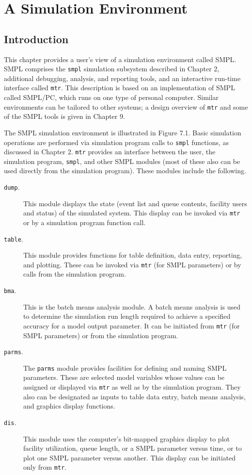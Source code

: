 \chapter{A Simulation Environment}
\label{chap:simulation-environment}

\section{Introduction}
\label{sec:simenv-intro}

This chapter provides a user's view of a simulation environment called
SMPL. SMPL comprises the \texttt{smpl} simulation subsystem described in Chapter
2, additional debugging, analysis, and reporting tools, and an interactive
run-time interface called \texttt{mtr}. This description is based on an implementation
of SMPL called SMPL/PC, which runs on one type of personal computer.
Similar environments can be tailored to other systems; a design overview of
\texttt{mtr} and some of the SMPL tools is given in Chapter 9.

The SMPL simulation environment is illustrated in Figure 7.1. Basic
simulation operations are performed via simulation program calls to \texttt{smpl}
functions, as discussed in Chapter 2. \texttt{mtr} provides an interface between the
user, the simulation program, \texttt{smpl}, and other SMPL modules (most of these
also can be used directly from the simulation program). These modules
include the following.

\begin{description}
\item[\texttt{dump}.] This module displays the state (event list and queue
contents, facility users and status) of the simulated system.
This display can be invoked via \texttt{mtr} or by a simulation
program function call.
\item[\texttt{table}.] This module provides functions for table definition,
data entry, reporting, and plotting. These can be invoked via
\texttt{mtr} (for SMPL parameters) or by calls from the simulation
program.
\item[\texttt{bma}.] This is the batch means analysis module. A batch
means analysis is used to determine the simulation run
length required to achieve a specified accuracy for a model
output parameter. It can be initiated from \texttt{mtr} (for SMPL
parameters) or from the simulation program.
\item[\texttt{parms}.] The \texttt{parms} module provides facilities for defining
and naming SMPL parameters. These are selected model
variables whose values can be assigned or displayed via \texttt{mtr}
as well as by the simulation program. They also can be designated
as inputs to table data entry, batch means analysis,
and graphics display functions.
\item[\texttt{dis}.] This module uses the computer's bit-mapped graphics
display to plot facility utilization, queue length, or a SMPL
parameter versus time, or to plot one SMPL parameter versus
another. This display can be initiated only from \texttt{mtr}.
\end{description}


